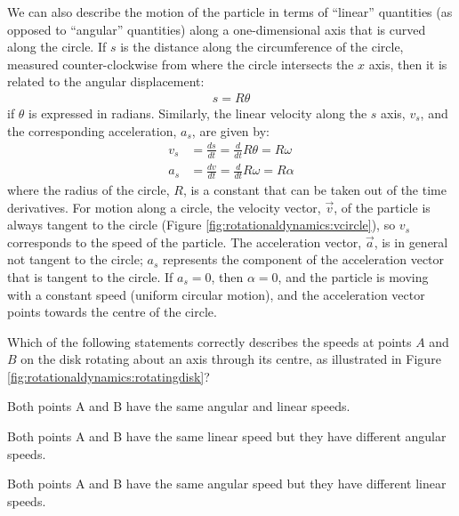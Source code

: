 We can also describe the motion of the particle in terms of ``linear'' quantities (as opposed to ``angular'' quantities) along a one-dimensional axis that is curved along the circle. If $s$ is the distance along the circumference of the circle, measured counter-clockwise from where the circle intersects the $x$ axis, then it is related to the angular displacement:
\begin{align*}
s = R\theta
\end{align*}
if $\theta$ is expressed in radians. Similarly, the linear velocity along the $s$ axis, $v_s$, and the corresponding acceleration, $a_s$, are given by:
\begin{align*}
v_s &= \frac{ds}{dt} =\frac{d}{dt}R\theta = R\omega\\
a_s&= \frac{dv}{dt} =\frac{d}{dt}R\omega = R\alpha
\end{align*}
where the radius of the circle, $R$, is a constant that can be taken out of the time derivatives. For motion along a circle, the velocity vector, $\vec v$, of the particle is always tangent to the circle (Figure \ref{fig:rotationaldynamics:vcircle}), so $v_s$ corresponds to the speed of the particle. The acceleration vector, $\vec a$, is in general not tangent to the circle; $a_s$ represents the component of the acceleration vector that is tangent to the circle. If $a_s=0$, then $\alpha=0$, and the particle is moving with a constant speed (uniform circular motion), and the acceleration vector points towards the centre of the circle.

\begin{checkpoint}
\begin{MCquestion}{Which of the following statements correctly describes the speeds at points $A$ and $B$ on the disk rotating about an axis through its centre, as illustrated in Figure \ref{fig:rotationaldynamics:rotatingdisk}?
}
\item Both points A and B have the same angular and linear speeds.
\item Both points A and B have the same linear speed but they have different angular speeds.
\item Both points A and B have the same angular speed but they have different linear speeds. %
\end{MCquestion}
\end{checkpoint}


